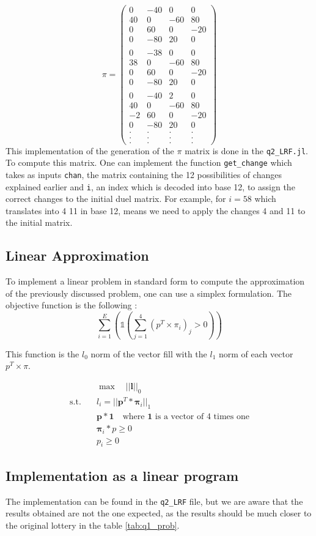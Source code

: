$$\pi = \begin{pmatrix}
  0 & -40 & 0 & 0\\
  40 & 0 & -60 & 80\\
  0 & 60 & 0 & -20\\
  0 & -80 & 20 & 0\\
  &&&\\
  0 & -38 & 0 & 0\\
  38 & 0 & -60 & 80\\
  0 & 60 & 0 & -20\\
  0 & -80 & 20 & 0\\
  &&&\\
  0 & -40 & 2 & 0\\
  40 & 0 & -60 & 80\\
  -2 & 60 & 0 & -20\\
  0 & -80 & 20 & 0\\
  . & . & . & .\\
  . & . & . & .\\
  . & . & . & .
\end{pmatrix}$$
This implementation of the generation of the $\pi$ matrix is done in the \verb|q2_LRF.jl|. 
To compute this matrix. One can implement the function \verb|get_change| which takes as inputs \verb|chan|, the matrix containing the 12 possibilities of changes explained earlier and \verb|i|, an index which is decoded into base 12, to assign the correct changes to the initial duel matrix. For example, for $i = 58$ which translates into 4 11 in base 12, means we need to apply the changes 4 and 11 to the initial matrix.

\subsection{Linear Approximation}

To implement a linear problem in standard form to compute the approximation of the previously discussed problem, one can use a simplex formulation. The objective function is the following :
$$\sum_{i=1}^E  \left( \mathbb{1} \left( \sum_{j=1}^4 \left( p^T \times \pi_i \right) _j>0 \right)\right)$$

This function is the  $l_0$ norm of the vector fill with the $l_1$ norm of each vector $p^T \times \pi$. 

\begin{align*}
&\max \quad ||\textbf{l}||_0\\
\text{s.t.}\quad &l_i = ||\textbf{p}^T * \boldsymbol{\pi}_i||_1\\
  &\textbf{p} * \mathbf{1} \quad\text{where $\mathbf{1}$ is a vector of 4 times one} \\
  &\boldsymbol\pi_i*p \ge 0\\
  &p_i \ge 0
\end{align*}

\subsection{Implementation as a linear program}
The implementation can be found in the \verb|q2_LRF| file, but we are aware that the results obtained are not the one expected, as the results should be much closer to the original lottery in the table \ref{tab:q1_prob}.